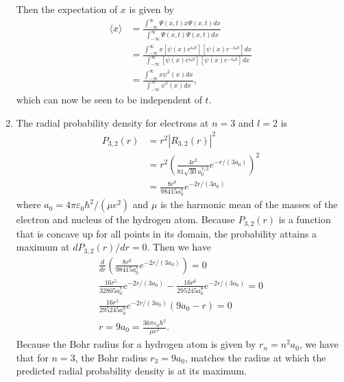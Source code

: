 \documentclass[a4paper,12pt]{article}
\begin{document}
\begin{enumerate}
        Then the expectation of $x$ is given by
        \begin{align*}
            \langle x \rangle &= \frac{ \int_{-\infty}^\infty \overline{\Psi(x, t)} x \Psi(x, t) dx }{ \int_{-\infty}^\infty \overline{\Psi(x, t)} \Psi(x, t) dx } \\
            &= \frac{ \int_{-\infty}^\infty x[\psi(x) e^{i \omega t}][\psi(x) e^{-i \omega t}] dx }{ \int_{-\infty}^\infty [\psi(x) e^{i \omega t}][\psi(x) e^{-i \omega t}] dx } \\
            &= \frac{ \int_{-\infty}^\infty x \psi^2(x) dx }{\int_{-\infty}^\infty \psi^2(x) dx},
        \end{align*}
        which can now be seen to be independent of $t$.

    \item
        The radial probability density for electrons at $n = 3$ and $l = 2$ is
        \begin{align*}
            P_{3, 2}(r) &= r^2 |R_{3, 2}(r)|^2 \\
            &= r^2 \left( \frac{4r^2}{81 \sqrt{30} a_0^{7/2}} e^{-r/(3a_0)} \right)^2 \\
            &= \frac{8r^6}{98415 a_0^7} e^{-2r/(3a_0)}
        \end{align*}
        where $a_0 = 4 \pi \varepsilon_0 \hbar^2 / (\mu e^2)$ and $\mu$ is the harmonic mean of the masses of the electron and nucleus of the hydrogen atom. Because $P_{3, 2}(r)$ is a function that is concave up for all points in its domain, the probability attains a maximum at $dP_{3, 2}(r) / dr = 0$. Then we have
        \begin{gather*}
            \frac{d}{dr} \left( \frac{8r^6}{98415 a_0^7} e^{-2r/(3a_0)} \right) = 0 \\
            \frac{16r^5}{32805 a_0^7} e^{-2r/(3a_0)} - \frac{16r^6}{295245 a_0^8} e^{-2r/(3a_0)} = 0 \\
            \frac{16r^5}{295245 a_0^8} e^{-2r/(3a_0)} (9a_0 - r) = 0 \\
            r = 9a_0 = \frac{36 \pi \varepsilon_0 \hbar^2}{\mu e^2}.
        \end{gather*}
        Because the Bohr radius for a hydrogen atom is given by $r_n = n^2 a_0$, we have that for $n = 3$, the Bohr radius $r_3 = 9 a_0$, matches the radius at which the predicted radial probability density is at its maximum.

\end{enumerate}
\end{document}
